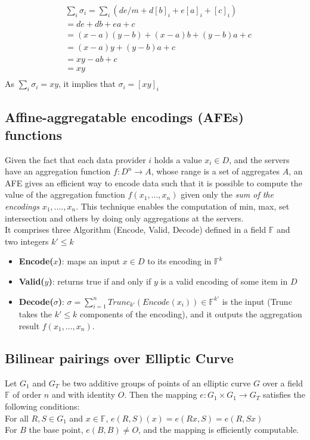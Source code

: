 \documentclass{article}
\begin{document}
\begin{equation}
\begin{split}
& \sum_{i} \sigma_i = \sum_{i}{(de/m +d[b]_i + e[a]_i + [c]_i)}\\
 & = de +db +ea + c\\
 & = (x-a)(y-b)+ (x-a)b + (y-b)a + c\\
 & = (x-a)y + (y-b)a + c\\
 & = xy -ab + c\\
 & = xy\\
\end{split}
\end{equation}
As $\sum_{i} \sigma_i = xy$, it implies that $\sigma_i = [xy]_i$ 

\subsection*{Affine-aggregatable encodings (AFEs) functions}
\label{afe}
Given the fact that each data provider $i$ holds a value $x_i \in D$, and the servers have an aggregation function $f : D^n \rightarrow A$, whose range is a set of aggregates $A$, an AFE gives an efficient way to encode data such that it is possible to compute the value of the aggregation function $f(x_1,...,x_n)$ given only the \textit{sum of the encodings} $x_1,....,x_n$. This technique enables the computation of min, max, set intersection and others by doing only aggregations at the servers.\\
It comprises three Algorithm (Encode, Valid, Decode) defined in a field $\mathbb{F}$ and two integers $k' \leq k$\\
\begin{itemize}
\item \textbf{Encode($x$)}: maps an input $x \in D$ to its encoding in $\mathbb{F}^k$
\item \textbf{Valid($y$)}: returns true if and only if $y$ is a valid encoding of some item in $D$
\item \textbf{Decode($\sigma$)}: $\sigma = \sum_{i=1}^{n}{Trunc_{k'}(Encode(x_i))} \in \mathbb{F}^{k'}$ is the input (Trunc takes the $k' \leq k$ components of the encoding), and it outputs the aggregation result $f(x_1,...,x_n)$.
\end{itemize}

\subsection*{Bilinear pairings over Elliptic Curve}
Let $G_1$ and $G_T$ be two additive groups of points of an elliptic curve $G$ over a field $\mathbb{F}$ of order $n$ and with identity $O$. Then the mapping $e: G_1 \times G_1 \rightarrow G_T$ satisfies the following conditions:\\
For all $R,S \in G_1$ and $x \in \mathbb{F}$, $e(R,S)(x) = e(Rx,S) = e(R,Sx)$\\
For $B$ the base point, $e(B,B) \neq O$, and the mapping is efficiently computable.
\end{document}
